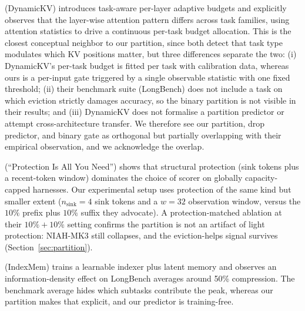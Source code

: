 \citet{arxiv241214838} (DynamicKV) introduces task-aware per-layer adaptive
budgets and explicitly observes that the layer-wise attention pattern
differs across task families, using attention statistics to drive a
continuous per-task budget allocation. This is the closest conceptual
neighbor to our partition, since both detect that task type modulates
which KV positions matter, but three differences separate the two: (i)
DynamicKV's per-task budget is fitted per task with calibration data,
whereas ours is a per-input gate triggered by a single observable
statistic with one fixed threshold; (ii) their benchmark suite (LongBench)
does not include a task on which eviction strictly damages accuracy, so
the binary partition is not visible in their results; and (iii) DynamicKV
does not formalise a partition predictor or attempt cross-architecture
transfer. We therefore see our partition, drop predictor, and binary gate
as orthogonal but partially overlapping with their empirical observation,
and we acknowledge the overlap.

\citet{arxiv260518053} (``Protection Is All You Need'') shows that
structural protection (sink tokens plus a recent-token window) dominates
the choice of scorer on globally capacity-capped harnesses. Our
experimental setup uses protection of the same kind but smaller extent
($n_{\text{sink}} = 4$ sink tokens and a $w = 32$ observation window,
versus the $10\%$ prefix plus $10\%$ suffix they advocate). A
protection-matched ablation at their $10\% + 10\%$ setting confirms the
partition is not an artifact of light protection: NIAH-MK3 still
collapses, and the eviction-helps signal survives
(Section~\ref{sec:partition}).

\citet{arxiv260525475} (IndexMem) trains a learnable indexer plus latent
memory and observes an information-density effect on LongBench averages
around 50\% compression. The benchmark average hides which subtasks
contribute the peak, whereas our partition makes that explicit, and our
predictor is training-free.

